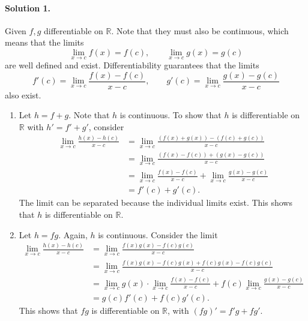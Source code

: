 \documentclass[10pt]{article}
\def\R{\mathbb{R}}
\begin{document}
    \paragraph{Solution 1.} Given $f, g$ differentiable on $\R$. Note that they must
    also be continuous, which means that the limits \[
        \lim_{x \to c} f(x) = f(c), \qquad \lim_{x \to c} g(x) = g(c)
    \] are well defined and exist. Differentiability guarantees that the limits
    \[
        f'(c) = \lim_{x \to c} \frac{f(x) - f(c)}{x - c}, \qquad 
        g'(c) = \lim_{x \to c} \frac{g(x) - g(c)}{x - c}
    \] also exist.
    \begin{enumerate}
        \item Let $h = f + g$. Note that $h$ is continuous. To show that $h$ is
        differentiable on $\R$ with $h' = f' + g'$, consider 
        \begin{align*}
            \lim_{x \to c} \frac{h(x) - h(c)}{x - c} 
                &= \lim_{x \to c} \frac{(f(x) + g(x)) - (f(c) + g(c))}{x - c} \\
                &= \lim_{x \to c} \frac{(f(x) - f(c)) + (g(x) - g(c))}{x - c} \\
                &= \lim_{x \to c} \frac{f(x) - f(c)}{x - c} + 
                    \lim_{x \to c} \frac{g(x) - g(c)}{x - c} \\
                &= f'(c) + g'(c).
        \end{align*}
        The limit can be separated because the individual limits exist. This
        shows that $h$ is differentiable on $\R$.

        \item Let $h = fg$. Again, $h$ is continuous. Consider the limit 
        \begin{align*}
            \lim_{x \to c} \frac{h(x) - h(c)}{x - c} 
                &= \lim_{x \to c} \frac{f(x)g(x) - f(c)g(c)}{x - c} \\
                &= \lim_{x \to c} \frac{f(x)g(x) - f(c)g(x) + 
                    f(c)g(x) - f(c)g(c)}{x - c} \\
                &= \lim_{x \to c}g(x)\cdot \lim_{x \to c}\frac{f(x) - f(c)}{x - c} 
                    + f(c) \lim_{x \to c} \frac{g(x) - g(c)}{x - c} \\
                &= g(c)f'(c) + f(c)g'(c).
        \end{align*}
        This shows that $fg$ is differentiable on $\R$, with $(fg)' = f'g + fg'$.


\end{enumerate}
\end{document}
